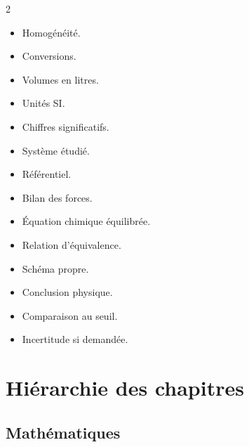 \documentclass[11pt,a4paper]{article}
\begin{document}
\begin{methode}
\begin{multicols}{2}
\begin{itemize}
  \item Homogénéité.
  \item Conversions.
  \item Volumes en litres.
  \item Unités SI.
  \item Chiffres significatifs.
  \item Système étudié.
  \item Référentiel.
  \item Bilan des forces.
  \item Équation chimique équilibrée.
  \item Relation d'équivalence.
  \item Schéma propre.
  \item Conclusion physique.
  \item Comparaison au seuil.
  \item Incertitude si demandée.
\end{itemize}
\end{multicols}
\end{methode}

\section{Hiérarchie des chapitres}

\subsection{Mathématiques}
\end{document}
